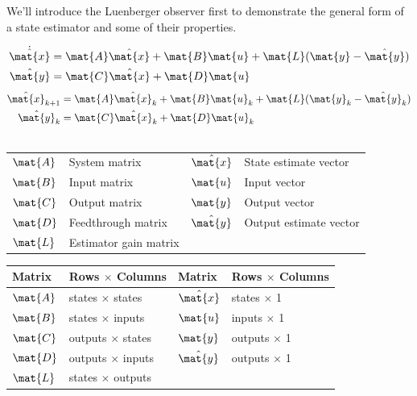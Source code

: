 We'll introduce the Luenberger observer first to demonstrate the general form of
a state estimator and some of their properties.
\begin{theorem}
  \begin{align}
    \dot{\hat{\mat{x}}} &= \mat{A}\hat{\mat{x}} + \mat{B}\mat{u} +
      \mat{L} (\mat{y} - \hat{\mat{y}}) \\
    \hat{\mat{y}} &= \mat{C}\hat{\mat{x}} + \mat{D}\mat{u}
  \end{align}
  \begin{align}
    \hat{\mat{x}}_{k+1} &= \mat{A}\hat{\mat{x}}_k + \mat{B}\mat{u}_k +
      \mat{L}(\mat{y}_k - \hat{\mat{y}}_k) \label{eq:z_obsv_x} \\
    \hat{\mat{y}}_k &= \mat{C}\hat{\mat{x}}_k + \mat{D}\mat{u}_k
      \label{eq:z_obsv_y} \\ \nonumber
  \end{align}
  \begin{figurekey}
    \begin{tabular}{llll}
      $\mat{A}$ & System matrix      & $\hat{\mat{x}}$ & State estimate vector \\
      $\mat{B}$ & Input matrix       & $\mat{u}$ & Input vector \\
      $\mat{C}$ & Output matrix      & $\mat{y}$ & Output vector \\
      $\mat{D}$ & Feedthrough matrix & $\hat{\mat{y}}$ & Output estimate vector \\
      $\mat{L}$ & Estimator gain matrix & & \\
    \end{tabular}
  \end{figurekey}
\end{theorem}
\begin{booktable}
  \begin{tabular}{|ll|ll|}
    \hline
    \rowcolor{headingbg}
    \textbf{Matrix} & \textbf{Rows $\times$ Columns} &
    \textbf{Matrix} & \textbf{Rows $\times$ Columns} \\
    \hline
    $\mat{A}$ & states $\times$ states & $\hat{\mat{x}}$ & states $\times$ 1 \\
    $\mat{B}$ & states $\times$ inputs & $\mat{u}$ & inputs $\times$ 1 \\
    $\mat{C}$ & outputs $\times$ states & $\mat{y}$ & outputs $\times$ 1 \\
    $\mat{D}$ & outputs $\times$ inputs & $\hat{\mat{y}}$ & outputs $\times$ 1 \\
    $\mat{L}$ & states $\times$ outputs & & \\
    \hline
  \end{tabular}
  \caption{Luenberger observer matrix dimensions}
\end{booktable}

